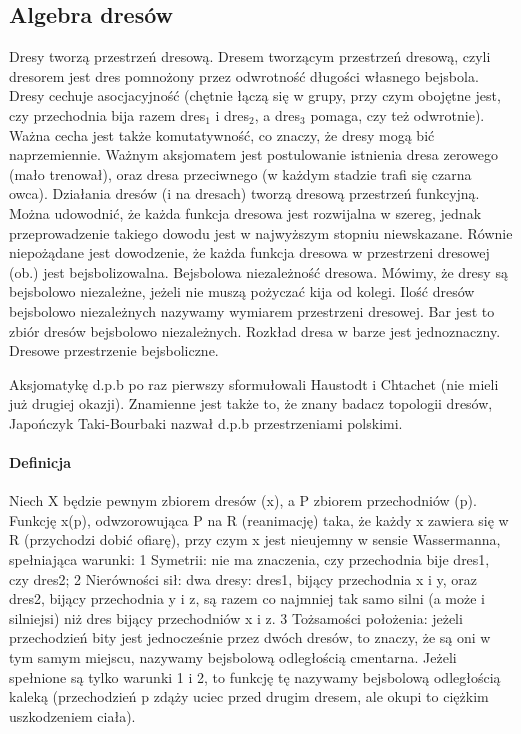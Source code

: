 \begin{parnumbers}
\section*{Algebra dresów}
Dresy tworzą przestrzeń dresową. Dresem tworzącym przestrzeń dresową, czyli dresorem jest dres pomnożony przez odwrotność długości własnego bejsbola. Dresy cechuje asocjacyjność (chętnie łączą się w grupy, przy czym obojętne jest, czy przechodnia bija razem dres$_1$ i dres$_2$, a dres$_3$ pomaga, czy też odwrotnie). Ważna cecha jest także komutatywność, co znaczy, że dresy mogą bić naprzemiennie. 
Ważnym aksjomatem jest postulowanie istnienia dresa zerowego (mało trenował), oraz dresa przeciwnego (w każdym stadzie trafi się czarna owca). 
Działania dresów (i na dresach) tworzą dresową przestrzeń funkcyjną. Można udowodnić, że każda funkcja dresowa jest rozwijalna w szereg, jednak przeprowadzenie takiego dowodu jest w najwyższym stopniu niewskazane. Równie niepożądane jest dowodzenie, że każda funkcja dresowa w przestrzeni dresowej (ob.) jest bejsbolizowalna. 
Bejsbolowa niezależność dresowa. 
Mówimy, że dresy są bejsbolowo niezależne, jeżeli nie muszą pożyczać kija od kolegi. Ilość dresów bejsbolowo niezależnych nazywamy wymiarem przestrzeni dresowej. Bar jest to zbiór dresów bejsbolowo niezależnych. Rozkład dresa w barze jest jednoznaczny. 
Dresowe przestrzenie bejsboliczne.
 
Aksjomatykę d.p.b po raz pierwszy sformułowali Haustodt i Chtachet (nie mieli już drugiej okazji). Znamienne jest także to, że znany badacz topologii dresów, Japończyk Taki-Bourbaki nazwał d.p.b przestrzeniami polskimi. 
\paragraph{Definicja} Niech X będzie pewnym zbiorem dresów (x), a P zbiorem przechodniów (p). Funkcję x(p), odwzorowująca P na R (reanimację) taka, że każdy x zawiera się w R (przychodzi dobić ofiarę), przy czym x jest nieujemny w sensie Wassermanna, spełniająca warunki: 1 Symetrii: nie ma znaczenia, czy przechodnia bije dres1, czy dres2; 2 Nierówności sił: dwa dresy: dres1, bijący przechodnia x i y, oraz dres2, bijący przechodnia y i z, są razem co najmniej tak samo silni (a może i silniejsi) niż dres bijący przechodniów x i z. 3 Tożsamości położenia: jeżeli przechodzień bity jest jednocześnie przez dwóch dresów, to znaczy, że są oni w tym samym miejscu, nazywamy bejsbolową odległością cmentarna. 
Jeżeli spełnione są tylko warunki 1 i 2, to funkcję tę nazywamy bejsbolową odległością kaleką (przechodzień p zdąży uciec przed drugim dresem, ale okupi to ciężkim uszkodzeniem ciała). 

\end{parnumbers}
